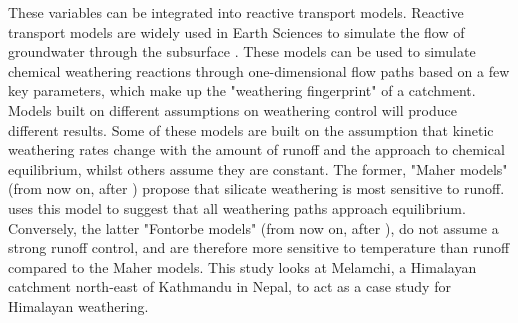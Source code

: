 These variables can be integrated into reactive transport models. Reactive transport models are widely used in Earth Sciences to simulate the flow of groundwater through the subsurface \parencite{bethkeGEOCHEMICALBIOGEOCHEMICALREACTION}. These models can be used to simulate chemical weathering reactions through one-dimensional flow paths based on a few key parameters, which make up the "weathering fingerprint" of a catchment. Models built on different assumptions on weathering control will produce different results. Some of these models are built on the assumption that kinetic weathering rates change with the amount of runoff and the approach to chemical equilibrium, whilst others assume they are constant. The former, "Maher models" (from now on, after \cite{maherRoleFluidResidence2011}) propose that silicate weathering is most sensitive to runoff. \cite{maherRoleFluidResidence2011} uses this model to suggest that all weathering paths approach equilibrium. Conversely, the latter "Fontorbe models" (from now on, after \cite{fontorbeSiliconIsotopicComposition2013}), do not assume a strong runoff control, and are therefore more sensitive to temperature than runoff compared to the Maher models. This study looks at Melamchi, a Himalayan catchment north-east of Kathmandu in Nepal, to act as a case study for Himalayan weathering.
\bsk

